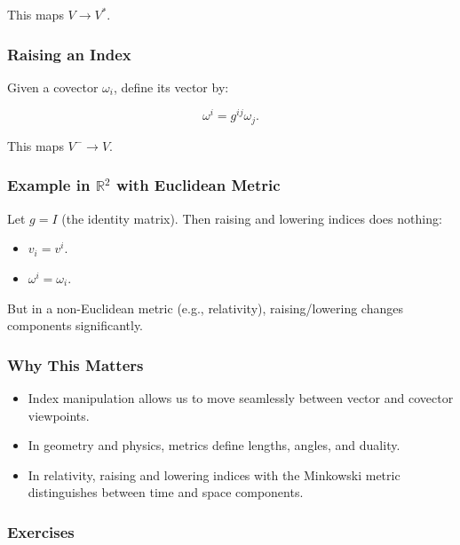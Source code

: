 \documentclass[
  letterpaper,
  DIV=11,
  numbers=noendperiod]{scrreprt}
\providecommand{\tightlist}{%
  \setlength{\itemsep}{0pt}\setlength{\parskip}{0pt}}
\begin{document}
This maps \(V \to V^*\).

\subsubsection{Raising an Index}\label{raising-an-index}

Given a covector \(\omega_i\), define its vector by:

\[
\omega^i = g^{ij} \omega_j.
\]

This maps \(V^- \to V\).

\subsubsection{\texorpdfstring{Example in \(\mathbb{R}^2\) with
Euclidean
Metric}{Example in \textbackslash mathbb\{R\}\^{}2 with Euclidean Metric}}\label{example-in-mathbbr2-with-euclidean-metric}

Let \(g = I\) (the identity matrix). Then raising and lowering indices
does nothing:

\begin{itemize}
\tightlist
\item
  \(v_i = v^i\).
\item
  \(\omega^i = \omega_i\).
\end{itemize}

But in a non-Euclidean metric (e.g., relativity), raising/lowering
changes components significantly.

\subsubsection{Why This Matters}\label{why-this-matters-30}

\begin{itemize}
\tightlist
\item
  Index manipulation allows us to move seamlessly between vector and
  covector viewpoints.
\item
  In geometry and physics, metrics define lengths, angles, and duality.
\item
  In relativity, raising and lowering indices with the Minkowski metric
  distinguishes between time and space components.
\end{itemize}

\subsubsection{Exercises}\label{exercises-43}
\end{document}
